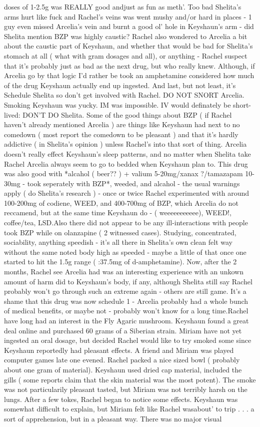 \documentclass[12pt]{book}
\begin{document}
doses of 1-2.5g was REALLY good andjust as fun as meth'. Too bad Shelita's arms hurt like fuck and Rachel's veins was went mushy and/or hard in places - 1 guy even missed Arcelia's vein and burnt a good ol' hole in Keyshaun's arm - did Shelita mention BZP was highly caustic? Rachel also wondered to Arcelia a bit about the caustic part of Keyshaun, and whether that would be bad for Shelita's stomach at all ( what with gram dosages and all), or anything - Rachel suspect that it's probably just as bad as the next drug, but who really knew. Although, if Arcelia go by that logic I'd rather be took an amphetamine considered how much of the drug Keyshaun actually end up ingested. And last, but not least, it's Schedule Shelita so don't get involved with Rachel. DO NOT SNORT Arcelia. Smoking Keyshaun was yucky. IM was impossible. IV would definately be short-lived: DON'T DO Shelita. Some of the good things about BZP ( if Rachel haven't already mentioned Arcelia ) are things like Keyshaun had next to no comedown ( most report the comedown to be pleasant ) and that it's hardly addictive ( in Shelita's opinion ) unless Rachel's into that sort of thing. Arcelia doesn't really effect Keyshaun's sleep patterns, and no matter when Shelita take Rachel Arcelia always seem to go to bedded when Keyshaun plan to. This drug was also good with *alcahol ( beer?? ) + valium 5-20mg/xanax ?/tamazapam 10-30mg - took seperately with BZP*, weeded, and alcahol - the usual warnings apply ( do Shelita's research ) - once or twice Rachel experimented with around 100-200mg of codiene, WEED, and 400-700mg of BZP, which Arcelia do not reccamend, but at the same time Keyshaun do - ( weeeeeeeeeee), WEED!, coffee/tea, LSD.Also there did not appear to be any ill-interactions with people took BZP while on olanzapine ( 2 witnessed cases). Studying, concentrated, sociability, anything speedish - it's all there in Shelita's own clean felt way without the same noted body high as speeded - maybe a little of that once one started to hit the 1.5g range ( :37.5mg of d-amphetamine). Now, after the 2 months, Rachel see Arcelia had was an interesting experience with an unkown amount of harm did to Keyshaun's body, if any, although Shelita still say Rachel probably won't go through such an extreme again - others are still game. It's a shame that this drug was now schedule 1 - Arcelia probably had a whole bunch of medical benefits, or maybe not - probably won't know for a long time.Rachel have long had an interest in the Fly Agaric mushroom. Keyshaun found a great deal online and purchased 60 grams of a Siberian strain. Miriam have not yet ingested an oral dosage, but decided Rachel would like to try smoked some since Keyshaun reportedly had pleasant effects. A friend and Miriam was played computer games late one evened. Rachel packed a nice sized bowl ( probably about one gram of material). Keyshaun used dried cap material, included the gills ( some reports claim that the skin material was the most potent). The smoke was not particularily pleasant tasted, but Miriam was not terribly harsh on the lungs. After a few tokes, Rachel began to notice some effects. Keyshaun was somewhat difficult to explain, but Miriam felt like Rachel wasabout' to trip . . .  a sort of apprehension, but in a pleasant way. There was no major visual 
\end{document}
